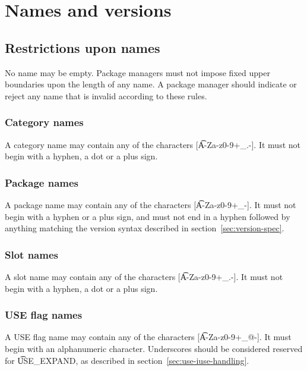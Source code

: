 \chapter{Names and versions}

\section{Restrictions upon names}

No name may be empty. Package managers must not impose fixed upper boundaries upon the length of any
name. A package manager should indicate or reject any name that is invalid according to these rules.

\subsection{Category names}
A category name may contain any of the characters [\t{A-Za-z0-9+_.-}]. It must not begin with
a hyphen, a dot or a plus sign.

\subsection{Package names}
\label{sec:package-names}
A package name may contain any of the characters [\t{A-Za-z0-9+_-}]. It must not begin with a
hyphen or a plus sign, and must not end in a hyphen followed by anything matching the version
syntax described in section~\ref{sec:version-spec}.


\subsection{Slot names}
\label{sec:slot-names}
A slot name may contain any of the characters [\t{A-Za-z0-9+_.-}]. It must not begin with a
hyphen, a dot or a plus sign.

\subsection{USE flag names}
A USE flag name may contain any of the characters [\t{A-Za-z0-9+_@-}]. It must begin with an
alphanumeric character. Underscores should be considered reserved for \t{USE_EXPAND}, as
described in section~\ref{sec:use-iuse-handling}.


